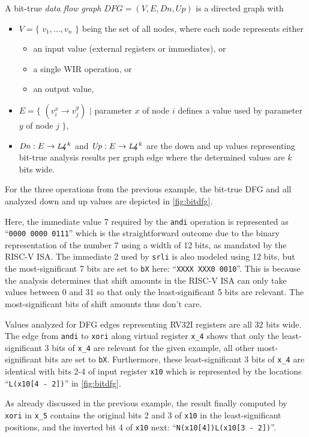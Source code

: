 \begin{definition} \label{def:bitdfg}
  A bit-true \emph{data flow graph} $\textit{DFG} = (V, E, \mathit{Dn}, \mathit{Up})$ is a directed graph with
  \begin{itemize}
    \item $V = \{$ $v_1, \dots, v_n$ $\}$ being the set of all nodes, where each node represents either
      \begin{itemize}
        \item an input value (external registers or immediates), or
        \item a single \gls{WIR} operation, or
        \item an output value,
      \end{itemize}
    \item $E = \{$ $(v_i^x \rightarrow v_j^y)$ $\vert$ parameter $x$ of node $i$ defines a value used by parameter $y$ of node $j$ $\}$,
    \item $\mathit{Dn}: E \rightarrow \texttt{\emph{L4}}^k$ and $\mathit{Up}: E \rightarrow \texttt{\emph{L4}}^k$ are the down and up values representing bit-true analysis results per graph edge where the determined values are $k$ bits wide.
  \end{itemize}
\end{definition}

\begin{wirExample}\label{ex:bitdfg}
For the three operations from the previous example, the bit-true \gls{DFG} and all analyzed down and up values are depicted in \cref{fig:bitdfg}.

Here, the immediate value 7 required by the \texttt{andi} operation is represented as ``\texttt{0000 0000 0111}'' which is the straightforward outcome due to the binary representation of the number 7 using a width of 12 bits, as mandated by the RISC-V \gls{ISA}.
The immediate 2 used by \texttt{srli} is also modeled using 12 bits, but the most-significant 7 bits are set to \texttt{bX} here: ``\texttt{XXXX XXX0 0010}''.
This is because the analysis determines that shift amounts in the RISC-V \gls{ISA} can only take values between 0 and 31 so that only the least-significant 5 bits are relevant.
The most-significant bits of shift amounts thus don't care.

Values analyzed for \gls{DFG} edges representing RV32I registers are all 32 bits wide.
The edge from \texttt{andi} to \texttt{xori} along virtual register \texttt{x\_4} shows that only the least-significant 3 bits of \texttt{x\_4} are relevant for the given example, all other most-significant bits are set to \texttt{bX}.
Furthermore, these least-significant 3 bits of \texttt{x\_4} are identical with bits 2-4 of input register \texttt{x10} which is represented by the locations ``\texttt{L(x10[4 - 2])}'' in \cref{fig:bitdfg}.

As already discussed in the previous example, the result finally computed by \texttt{xori} in \texttt{x\_5} contains the original bits 2 and 3 of \texttt{x10} in the least-significant positions, and the inverted bit 4 of \texttt{x10} next: ``\texttt{N(x10[4])L(x10[3 - 2])}''.
\end{wirExample}

